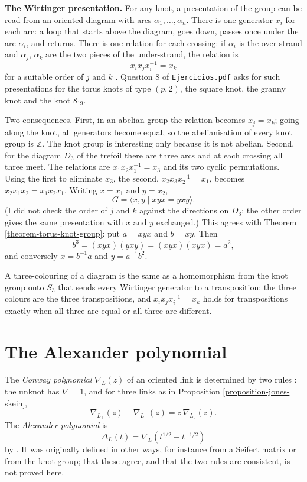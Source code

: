 \medskip\noindent
{\bf The Wirtinger presentation.} For
any knot, a presentation of the group
can be read from an oriented diagram
with arcs $\alpha_1,\ldots,\alpha_n$.
There is one generator $x_i$ for each
arc: a loop that starts above the
diagram, goes down, passes once under
the arc $\alpha_i$, and returns. There
is one relation for each crossing: if
$\alpha_i$ is the over-strand and
$\alpha_j$, $\alpha_k$ are the two
pieces of the under-strand, the
relation is
$$
x_ix_jx_i^{-1}=x_k
$$
for a suitable order of $j$ and $k$
\cite[Section 1.2,
Exercise 22]{hatcher}.
Question 8 of {\tt Ejercicios.pdf} asks
for such presentations for the torus
knots of type $(p,2)$, the square knot,
the granny knot and the knot $8_{19}$.

\medskip\noindent
Two consequences. First, in an abelian
group the relation becomes $x_j=x_k$;
going along the knot, all generators
become equal, so the abelianisation of
every knot group is $\mathbb{Z}$. The
knot group is interesting only because
it is not abelian. Second, for the
diagram $D_3$ of the trefoil there are
three arcs and at each crossing all
three meet. The relations are
$x_1x_2x_1^{-1}=x_3$ and its two cyclic
permutations. Using the first to
eliminate $x_3$, the second,
$x_2x_3x_2^{-1}=x_1$, becomes
$x_2x_1x_2=x_1x_2x_1$. Writing $x=x_1$
and $y=x_2$,
$$
G=\langle x,y\mid xyx=yxy\rangle.
$$
(I did not check the order of $j$ and
$k$ against the directions on $D_3$;
the other order gives the same
presentation with $x$ and $y$
exchanged.) This agrees with
Theorem \ref{theorem-torus-knot-group}:
put $a=xyx$ and $b=xy$. Then
$$
b^{3}=(xyx)(yxy)=(xyx)(xyx)=a^{2},
$$
and conversely $x=b^{-1}a$ and
$y=a^{-1}b^{2}$.

\begin{remark}
\label{remark-colourings-and-group}
A three-colouring of a diagram is the
same as a homomorphism from the knot
group onto $S_3$ that sends every
Wirtinger generator to a transposition:
the three colours are the three
transpositions, and
$x_ix_jx_i^{-1}=x_k$ holds for
transpositions exactly when all three
are equal or all three are different.
\end{remark}

\section{The Alexander polynomial}
\label{section-alexander}

\noindent
The {\it Conway polynomial}
$\nabla_L(z)$ of an oriented link is
determined by two rules
\cite[Chapter 6, Section 2]{murasugi}:
the unknot has $\nabla=1$, and for
three links as in
Proposition \ref{proposition-jones-skein},
$$
\nabla_{L_{+}}(z)-\nabla_{L_{-}}(z)
=z\,\nabla_{L_{0}}(z).
$$
The {\it Alexander polynomial} is
$$
\Delta_L(t)
=\nabla_L\left(t^{1/2}-t^{-1/2}\right)
$$
by \cite[Theorem 6.2.1]{murasugi}. It
was originally defined in other ways,
for instance from a Seifert matrix or
from the knot group; that these agree,
and that the two rules are consistent,
is not proved here.


